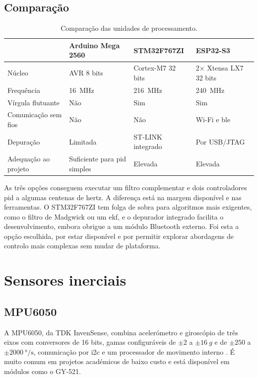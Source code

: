 \subsection{Comparação}
\begin{table}[H]
\centering\small
\caption{Comparação das unidades de processamento.}
\begin{tabularx}{\textwidth}{>{\raggedright\arraybackslash}p{3cm}YYY}
\toprule
 & Arduino Mega 2560 & STM32F767ZI & ESP32-S3\\\midrule
Núcleo & AVR 8 bits & Cortex-M7 32 bits & 2$\times$ Xtensa LX7 32 bits\\
Frequência & 16~MHz & 216~MHz & 240~MHz\\
Vírgula flutuante & Não & Sim & Sim\\
Comunicação sem fios & Não & Não & Wi-Fi e \acrshort{ble}\\
Depuração & Limitada & ST-LINK integrado & Por USB/JTAG\\
Adequação ao projeto & Suficiente para \acrshort{pid} simples & Elevada & Elevada\\
\bottomrule
\end{tabularx}
\label{tab:mcu}
\end{table}

As três opções conseguem executar um filtro complementar e dois controladores \gls{pid} a algumas centenas de hertz. A diferença está na margem disponível e nas ferramentas. O STM32F767ZI tem folga de sobra para algoritmos mais exigentes, como o filtro de Madgwick ou um \gls{ekf}, e o depurador integrado facilita o desenvolvimento, embora obrigue a um módulo Bluetooth externo. Foi esta a opção escolhida, por estar disponível e por permitir explorar abordagens de controlo mais complexas sem mudar de plataforma.

\section{Sensores inerciais}

\subsection{MPU6050}
A MPU6050, da TDK InvenSense, combina acelerómetro e giroscópio de três eixos com conversores de 16 bits, gamas configuráveis de $\pm2$ a $\pm\SI{16}{g}$ e de $\pm250$ a $\pm\SI{2000}{\degree\per\second}$, comunicação por \gls{i2c} e um processador de movimento interno \cite{mpu6050}. É muito comum em projetos académicos de baixo custo \cite{tawfeeq2022} e está disponível em módulos como o GY-521.

